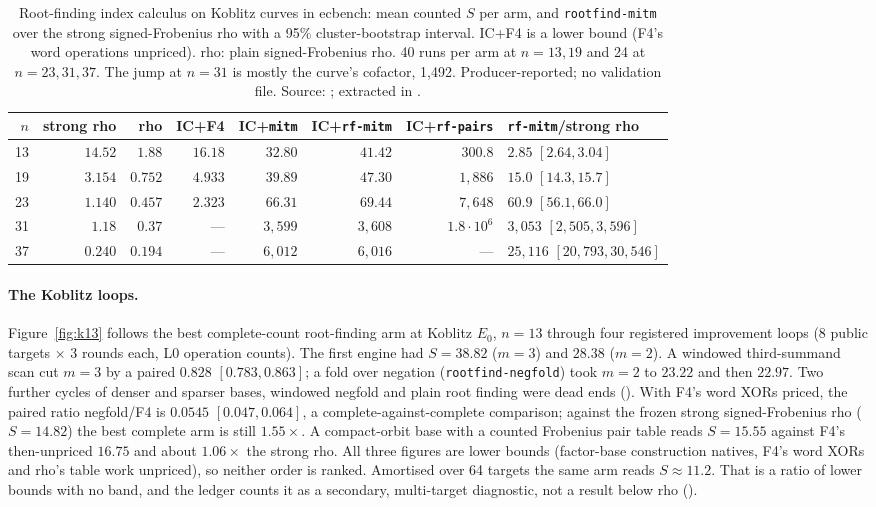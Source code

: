 \begin{table}[t]
\centering\small
\setlength{\tabcolsep}{4pt}
\begin{tabular}{@{}rrrrrrrl@{}}
\toprule
$n$ & strong rho & rho & IC+F4 & IC+\texttt{mitm} & IC+\texttt{rf-mitm} & IC+\texttt{rf-pairs} & \texttt{rf-mitm}/strong rho \\
\midrule
13 & $14.52$ & $1.88$ & $16.18$ & $32.80$ & $41.42$ & $300.8$ & $2.85$ $[2.64,3.04]$ \\
19 & $3.154$ & $0.752$ & $4.933$ & $39.89$ & $47.30$ & $1{,}886$ & $15.0$ $[14.3,15.7]$ \\
23 & $1.140$ & $0.457$ & $2.323$ & $66.31$ & $69.44$ & $7{,}648$ & $60.9$ $[56.1,66.0]$ \\
31 & $1.18$ & $0.37$ & --- & $3{,}599$ & $3{,}608$ & $1.8\cdot10^6$ & $3{,}053$ $[2{,}505,3{,}596]$ \\
37 & $0.240$ & $0.194$ & --- & $6{,}012$ & $6{,}016$ & --- & $25{,}116$ $[20{,}793,30{,}546]$ \\
\bottomrule
\end{tabular}
\caption[]{Root-finding index calculus on Koblitz curves in ecbench: mean
counted $S$ per arm, and \texttt{rootfind-mitm} over the strong
signed-Frobenius rho with a 95\% cluster-bootstrap interval. IC+F4 is a
lower bound (F4's word operations unpriced). rho: plain signed-Frobenius
rho. 40 runs per arm at $n=13,19$ and 24 at $n=23,31,37$. The jump at
$n=31$ is mostly the curve's cofactor, 1{,}492. Producer-reported; no
validation file. Source:
; extracted in
.}
\label{tab:pf-rf-koblitz}
\end{table}

\paragraph{The Koblitz loops.} Figure~\ref{fig:k13} follows the best
complete-count root-finding arm at Koblitz $E_0$, $n=13$ through four
registered improvement loops (8 public targets $\times$ 3 rounds each, L0
operation counts). The first engine had $S=38.82$ ($m=3$) and $28.38$
($m=2$). A windowed third-summand scan cut $m=3$ by a paired $0.828$
$[0.783,0.863]$; a fold over negation (\texttt{rootfind-negfold}) took
$m=2$ to $23.22$ and then $22.97$. Two further cycles of denser and
sparser bases, windowed negfold and plain root finding were dead ends
(). With F4's word XORs
priced, the paired ratio negfold/F4 is $0.0545$ $[0.047,0.064]$, a
complete-against-complete comparison; against the frozen strong signed-Frobenius
rho ($S=14.82$) the best complete arm is still $1.55\times$. A compact-orbit
base with a counted Frobenius pair table reads $S=15.55$ against F4's
then-unpriced $16.75$ and about $1.06\times$ the strong rho. All three
figures are lower bounds (factor-base construction natives, F4's word XORs
and rho's table work unpriced), so neither order is ranked. Amortised over
64 targets the same arm reads $S\approx11.2$. That is a ratio of lower
bounds with no band, and the ledger counts it as a secondary, multi-target
diagnostic, not a result below rho
().

